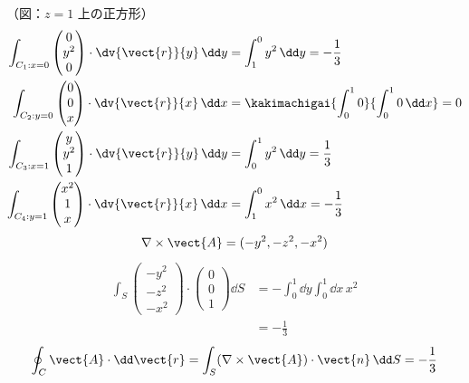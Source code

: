 （図：$z=1$ 上の正方形）
\begin{align*}
\int_{C_{1}:x=0}\begin{pmatrix}0\\y^{2}\\0\end{pmatrix}\cdot\dv{\vect{r}}{y}\,\dd y&=\int_{1}^{0}y^{2}\,\dd y=-\frac{1}{3}\\
\int_{C_{2}:y=0}\begin{pmatrix}0\\0\\x\end{pmatrix}\cdot\dv{\vect{r}}{x}\,\dd x&=\kakimachigai{\int_{0}^{1}0}{\int_{0}^{1}0\,\dd x}=0\\
\int_{C_{3}:x=1}\begin{pmatrix}y\\y^{2}\\1\end{pmatrix}\cdot\dv{\vect{r}}{y}\,\dd y&=\int_{0}^{1}y^{2}\,\dd y=\frac{1}{3}\\
\int_{C_{4}:y=1}\begin{pmatrix}x^{2}\\1\\x\end{pmatrix}\cdot\dv{\vect{r}}{x}\,\dd x&=\int_{1}^{0}x^{2}\,\dd x=-\frac{1}{3}
\end{align*}
\[ \nabla\times\vect{A}=(-y^{2},-z^{2},-x^{2}) \]
\begin{align*}
\int_{S}\begin{pmatrix}-y^{2}\\-z^{2}\\-x^{2}\end{pmatrix}\cdot\begin{pmatrix}0\\0\\1\end{pmatrix}\dd S&=-\int_{0}^{1}\dd y\int_{0}^{1}\dd x\,x^{2}\\
&=-\frac{1}{3}
\end{align*}
\[ \oint_{C}\vect{A}\cdot\dd\vect{r}=\int_{S}(\nabla\times\vect{A})\cdot\vect{n}\,\dd S=-\frac{1}{3} \]
